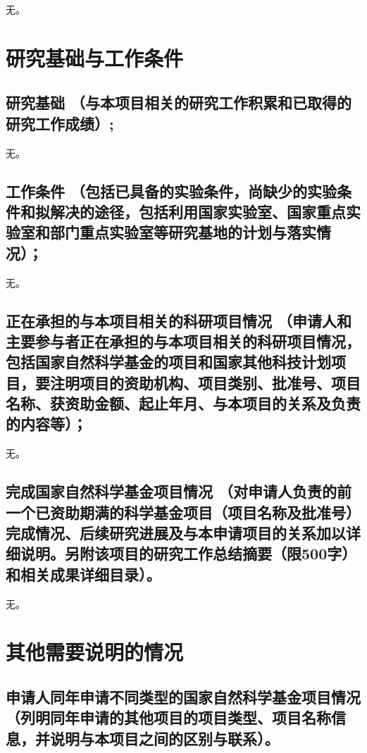 \documentclass{nsfc}
\begin{document}
无。

\chapter{研究基础与工作条件}


\section{
    \textbf{研究基础}
    （与本项目相关的研究工作积累和已取得的研究工作成绩）;
}

无。

\section{
    \textbf{工作条件}
    （包括已具备的实验条件，尚缺少的实验条件和拟解决的途径，包括利用国家实验室、国家重点实验室和部门重点实验室等研究基地的计划与落实情况）；
}

无。

\section{
    \textbf{正在承担的与本项目相关的科研项目情况}
    （申请人和主要参与者正在承担的与本项目相关的科研项目情况，包括国家自然科学基金的项目和国家其他科技计划项目，要注明项目的资助机构、项目类别、批准号、项目名称、获资助金额、起止年月、与本项目的关系及负责的内容等）；
}

无。

\section{
    \textbf{完成国家自然科学基金项目情况}
    （对申请人负责的前一个已资助期满的科学基金项目（项目名称及批准号）完成情况、后续研究进展及与本申请项目的关系加以详细说明。另附该项目的研究工作总结摘要（限500字）和相关成果详细目录）。
}

无。

\chapter{其他需要说明的情况}

\section{申请人同年申请不同类型的国家自然科学基金项目情况（列明同年申请的其他项目的项目类型、项目名称信息，并说明与本项目之间的区别与联系）。}
\end{document}
